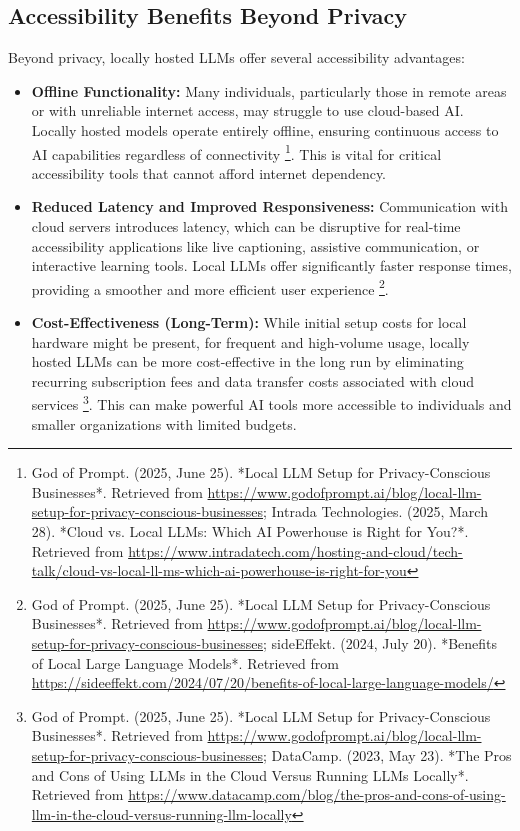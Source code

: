 \subsection{Accessibility Benefits Beyond Privacy}
Beyond privacy, locally hosted LLMs offer several accessibility advantages:
\begin{itemize}
    \item \textbf{Offline Functionality:} Many individuals, particularly those in remote areas or with unreliable internet access, may struggle to use cloud-based AI. Locally hosted models operate entirely offline, ensuring continuous access to AI capabilities regardless of connectivity \footnote{God of Prompt. (2025, June 25). *Local LLM Setup for Privacy-Conscious Businesses*. Retrieved from \url{https://www.godofprompt.ai/blog/local-llm-setup-for-privacy-conscious-businesses}; Intrada Technologies. (2025, March 28). *Cloud vs. Local LLMs: Which AI Powerhouse is Right for You?*. Retrieved from \url{https://www.intradatech.com/hosting-and-cloud/tech-talk/cloud-vs-local-ll-ms-which-ai-powerhouse-is-right-for-you}}. This is vital for critical accessibility tools that cannot afford internet dependency.
    \item \textbf{Reduced Latency and Improved Responsiveness:} Communication with cloud servers introduces latency, which can be disruptive for real-time accessibility applications like live captioning, assistive communication, or interactive learning tools. Local LLMs offer significantly faster response times, providing a smoother and more efficient user experience \footnote{God of Prompt. (2025, June 25). *Local LLM Setup for Privacy-Conscious Businesses*. Retrieved from \url{https://www.godofprompt.ai/blog/local-llm-setup-for-privacy-conscious-businesses}; sideEffekt. (2024, July 20). *Benefits of Local Large Language Models*. Retrieved from \url{https://sideeffekt.com/2024/07/20/benefits-of-local-large-language-models/}}.
    \item \textbf{Cost-Effectiveness (Long-Term):} While initial setup costs for local hardware might be present, for frequent and high-volume usage, locally hosted LLMs can be more cost-effective in the long run by eliminating recurring subscription fees and data transfer costs associated with cloud services \footnote{God of Prompt. (2025, June 25). *Local LLM Setup for Privacy-Conscious Businesses*. Retrieved from \url{https://www.godofprompt.ai/blog/local-llm-setup-for-privacy-conscious-businesses}; DataCamp. (2023, May 23). *The Pros and Cons of Using LLMs in the Cloud Versus Running LLMs Locally*. Retrieved from \url{https://www.datacamp.com/blog/the-pros-and-cons-of-using-llm-in-the-cloud-versus-running-llm-locally}}. This can make powerful AI tools more accessible to individuals and smaller organizations with limited budgets.

\end{itemize}

